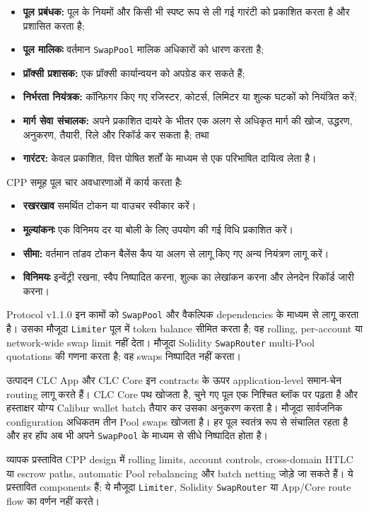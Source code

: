 \documentclass[11pt]{article}
\begin{document}
\begin{itemize}[leftmargin=*]
\item \textbf{पूल प्रबंधक:} पूल के नियमों और किसी भी स्पष्ट रूप से ली गई गारंटी को प्रकाशित करता है और प्रशासित करता है;
\item \textbf{पूल मालिकः} वर्तमान \texttt{SwapPool} मालिक अधिकारों को धारण करता है;
\item \textbf{प्रॉक्सी प्रशासक:} एक प्रॉक्सी कार्यान्वयन को अपग्रेड कर सकते हैं;
\item \textbf{निर्भरता नियंत्रक:} कॉन्फ़िगर किए गए रजिस्टर, कोटर्स, लिमिटर या शुल्क घटकों को नियंत्रित करें;
\item \textbf{मार्ग सेवा संचालक:} अपने प्रकाशित दायरे के भीतर एक अलग से अधिकृत मार्ग की खोज, उद्धरण, अनुकरण, तैयारी, रिले और रिकॉर्ड कर सकता है; तथा
\item \textbf{गारंटर:} केवल प्रकाशित, वित्त पोषित शर्तों के माध्यम से एक परिभाषित दायित्व लेता है।
\end{itemize}
CPP समूह पूल चार अवधारणाओं में कार्य करता हैः

\begin{itemize}[leftmargin=*]
\item \textbf{रखरखाव} समर्थित टोकन या वाउचर स्वीकार करें।
\item \textbf{मूल्यांकनः} एक विनिमय दर या बोली के लिए उपयोग की गई विधि प्रकाशित करें।
\item \textbf{सीमा:} वर्तमान तांडव टोकन बैलेंस कैप या अलग से लागू किए गए अन्य नियंत्रण लागू करें।
\item \textbf{विनिमयः} इन्वेंट्री रखना, स्वैप निष्पादित करना, शुल्क का लेखांकन करना और लेनदेन रिकॉर्ड जारी करना।
\end{itemize}
Protocol v1.1.0 इन कामों को \texttt{SwapPool} और वैकल्पिक dependencies के माध्यम से लागू करता है। उसका मौजूदा \texttt{Limiter} पूल में token balance सीमित करता है; वह rolling, per-account या network-wide swap limit नहीं देता। मौजूदा Solidity \texttt{SwapRouter} multi-Pool quotations की गणना करता है; वह swaps निष्पादित नहीं करता।

उत्पादन CLC App और CLC Core इन contracts के ऊपर application-level समान-चेन routing लागू करते हैं। CLC Core पथ खोजता है, चुने गए पूल एक निश्चित ब्लॉक पर पढ़ता है और हस्ताक्षर योग्य Calibur wallet batch तैयार कर उसका अनुकरण करता है। मौजूदा सार्वजनिक configuration अधिकतम तीन Pool swaps खोजता है। हर पूल स्वतंत्र रूप से संचालित रहता है और हर हॉप अब भी अपने \texttt{SwapPool} के माध्यम से सीधे निष्पादित होता है।

व्यापक प्रस्तावित CPP design में rolling limits, account controls, cross-domain HTLC या escrow paths, automatic Pool rebalancing और batch netting जोड़े जा सकते हैं। ये प्रस्तावित components हैं; ये मौजूदा \texttt{Limiter}, Solidity \texttt{SwapRouter} या App/Core route flow का वर्णन नहीं करते।
\end{document}
